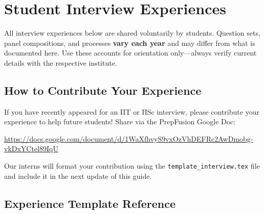 
\chapter{Student Interview Experiences}
\label{app:experiences}

\begin{disclaimer}
  All interview experiences below are shared voluntarily by \PrepFusion students.
  Question sets, panel compositions, and processes \textbf{vary each year} and
  may differ from what is documented here. Use these accounts for orientation
  only---always verify current details with the respective institute.
\end{disclaimer}

\section{How to Contribute Your Experience}
\label{sec:contribute}

If you have recently appeared for an IIT or IISc interview, please contribute
your experience to help future students! Share via the PrepFusion Google Doc:

\begin{center}
  \url{https://docs.google.com/document/d/1WaXfhvyS9vxOzVhDEFRc2AwDmobg-vkDxYCtel89IqU}
\end{center}

Our interns will format your contribution using the \texttt{template\_interview.tex}
file and include it in the next update of this guide.

\section{Experience Template Reference}
\label{sec:template-ref}

